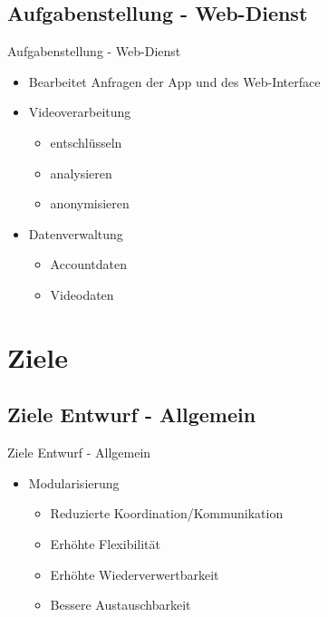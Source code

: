 \documentclass[19pt]{beamer}
\begin{document}
\subsection{Aufgabenstellung - Web-Dienst}
\begin{frame}{Aufgabenstellung - Web-Dienst}
	\begin{itemize}
		\item Bearbeitet Anfragen der App und des Web-Interface
		\item Videoverarbeitung
			\begin{itemize}
				\item entschl\"usseln
				\item analysieren
				\item anonymisieren
			\end{itemize}
		\item Datenverwaltung
			\begin{itemize}
				\item Accountdaten
				\item Videodaten
			\end{itemize}
	\end{itemize}
\end{frame}


\section{Ziele}

\subsection{Ziele Entwurf - Allgemein}
\begin{frame}{Ziele Entwurf - Allgemein}
	\begin{itemize}
    	\item Modularisierung
		\begin{itemize}
			\item Reduzierte Koordination/Kommunikation
			\item Erhöhte Flexibilität
			\item Erhöhte Wiederverwertbarkeit
			\item Bessere Austauschbarkeit
		\end{itemize}
	\end{itemize}
\end{frame}
\end{document}
